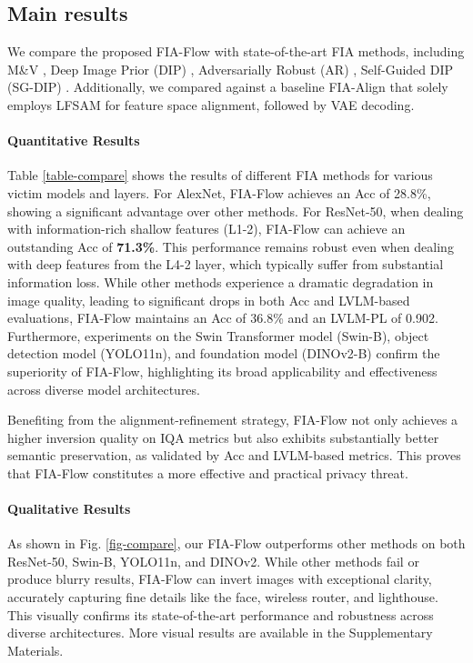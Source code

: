 \subsection{Main results}
We compare the proposed FIA-Flow with state-of-the-art FIA methods, including M\&V \cite{mahendran2015understanding}, Deep Image Prior (DIP) \cite{dmitry2020deep}, Adversarially Robust (AR) \cite{rojas2022inverting}, Self-Guided DIP (SG-DIP) \cite{liang2025analysis}. 
Additionally, we compared against a baseline FIA-Align that solely employs LFSAM for feature space alignment, followed by VAE decoding.


\paragraph{Quantitative Results}
Table \ref{table-compare} shows the results of different FIA methods for various victim models and layers.
For AlexNet, FIA-Flow achieves an Acc of 28.8\%, showing a significant advantage over other methods.
For ResNet-50, when dealing with information-rich shallow features (L1-2), FIA-Flow can achieve an outstanding Acc of \textbf{71.3\%}.
This performance remains robust even when dealing with deep features from the L4-2 layer, which typically suffer from substantial information loss. 
While other methods experience a dramatic degradation in image quality, leading to significant drops in both Acc and LVLM-based evaluations, FIA-Flow maintains an Acc of 36.8\% and an LVLM-PL of 0.902. 
Furthermore, experiments on the Swin Transformer model (Swin-B), object detection model (YOLO11n), and foundation model (DINOv2-B) confirm the superiority of FIA-Flow, highlighting its broad applicability and effectiveness across diverse model architectures.

Benefiting from the alignment-refinement strategy, FIA-Flow not only achieves a higher inversion quality on IQA metrics but also exhibits substantially better semantic preservation, as validated by Acc and LVLM-based metrics. 
This proves that FIA-Flow constitutes a more effective and practical privacy threat.

\paragraph{Qualitative Results}
As shown in Fig. \ref{fig-compare}, our FIA-Flow outperforms other methods on both ResNet-50, Swin-B, YOLO11n, and DINOv2. 
While other methods fail or produce blurry results, FIA-Flow can invert images with exceptional clarity, accurately capturing fine details like the face, wireless router, and lighthouse. 
This visually confirms its state-of-the-art performance and robustness across diverse architectures. 
More visual results are available in the Supplementary Materials.

